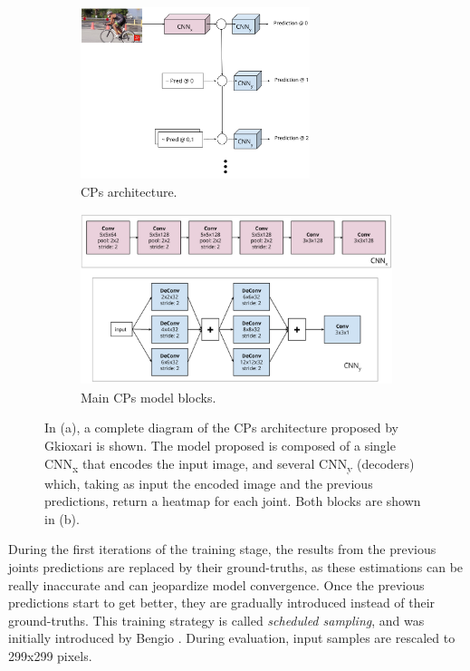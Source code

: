 \begin{figure}[h]\centering
    \begin{subfigure}{0.41\textwidth}\centering
        \includegraphics[height=5cm]{figures/cp_general.png} 
        \caption{CPs architecture.}
        \label{subfig:cp_general}
    \end{subfigure}
    \begin{subfigure}{0.58\textwidth}\centering
        \includegraphics[height=5cm]{figures/cp_particular.png}
        \caption{Main CPs  model blocks.}
        \label{subfig:cp_particular}
    \end{subfigure}
    \caption{In (a), a complete diagram of the CPs architecture proposed by Gkioxari \etal\cite{Gkioxari2016-ix} is shown. The model proposed is composed of a single CNN\textsubscript{x} that encodes the input image, and several CNN\textsubscript{y} (decoders) which, taking as input the encoded image and the previous predictions, return a heatmap for each joint. Both blocks are shown in (b).}
    \label{fig:cp}
\end{figure}

During the first iterations of the training stage, the results from the previous joints predictions are replaced by their ground-truths, as these estimations can be really inaccurate and can jeopardize model convergence. Once the previous predictions start to get better, they are gradually introduced instead of their ground-truths. This training strategy is called \emph{scheduled sampling}, and was initially introduced by Bengio \etal\cite{bengio2015scheduled}. During evaluation, input samples are rescaled to 299x299 pixels.

